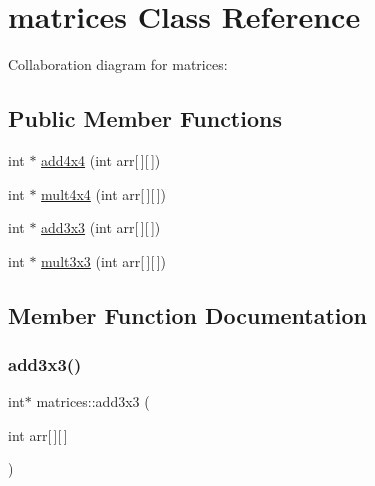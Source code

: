 \hypertarget{classmatrices}{}\section{matrices Class Reference}
\label{classmatrices}


Collaboration diagram for matrices\+:
\subsection*{Public Member Functions}
\begin{DoxyCompactItemize}
\item 
int $\ast$ \hyperlink{classmatrices_a65e362b1db7ec3bf04b60b868e8b432d}{add4x4} (int arr\mbox{[}$\,$\mbox{]}\mbox{[}$\,$\mbox{]})
\item 
int $\ast$ \hyperlink{classmatrices_a97708324cbb5612c867c494846116c84}{mult4x4} (int arr\mbox{[}$\,$\mbox{]}\mbox{[}$\,$\mbox{]})
\item 
int $\ast$ \hyperlink{classmatrices_a1200dc125cabee08728f6bec0aa8905a}{add3x3} (int arr\mbox{[}$\,$\mbox{]}\mbox{[}$\,$\mbox{]})
\item 
int $\ast$ \hyperlink{classmatrices_a23a1caa682ac0fb8941e6f5a4cfd6cb7}{mult3x3} (int arr\mbox{[}$\,$\mbox{]}\mbox{[}$\,$\mbox{]})
\end{DoxyCompactItemize}


\subsection{Member Function Documentation}
\mbox{\label{classmatrices_a1200dc125cabee08728f6bec0aa8905a}} 
\subsubsection{\texorpdfstring{add3x3()}{add3x3()}}
{\footnotesize\ttfamily int$\ast$ matrices\+::add3x3 (\begin{DoxyParamCaption}\item[{int}]{arr\mbox{[}$\,$\mbox{]}\mbox{[}$\,$\mbox{]} }\end{DoxyParamCaption})\hspace{0.3cm}{\ttfamily [inline]}}

\mbox{\label{classmatrices_a65e362b1db7ec3bf04b60b868e8b432d}} 

